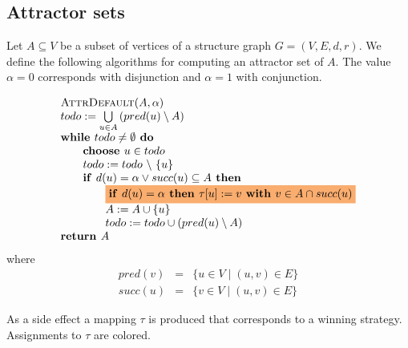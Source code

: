 \documentclass{article}
\newcommand{\If}{\text{\textbf{if }}}
\newcommand{\Do}{\text{\textbf{ do }}}
\newcommand{\Then}{\text{\textbf{ then }}}
\newcommand{\While}{\text{\textbf{while }}}
\newcommand{\Choose}{\text{\textbf{choose }}}
\newcommand{\Return}{\text{\textbf{return }}}
\newcommand{\With}{\text{\textbf{ with }}}
\begin{document}
\subsection{Attractor sets}
Let $A \subseteq V$ be a subset of vertices of a structure graph $G=(V,E,d,r)$. We
define the following algorithms for computing an attractor set of $A$. The value
$\alpha = 0$ corresponds with disjunction and $\alpha = 1$ with conjunction.

\begin{equation*}
\begin{array}{l}
\textsc{AttrDefault}(A,\alpha) \\ 
todo:=\bigcup\limits_{u\in A}\left( pred(u)\setminus A\right)  \\ 
\While todo\neq \emptyset \Do \\ 
\qquad \Choose u\in todo \\ 
\qquad todo:=todo\ \backslash \ \{u\} \\ 
\qquad \If d(u) = \alpha \vee succ(u)\subseteq A \Then \\ 
\qquad \qquad \colorbox{Apricot}{$ \If d(u) = \alpha \Then \tau
\lbrack u]:=v\With v\in A\cap succ(u) $}\\ 
\qquad \qquad A:=A\cup \{u\} \\ 
\qquad \qquad todo:=todo\cup \left( pred(u)\setminus A\right)  \\ 
\Return A%
\end{array}%
\end{equation*}%
where%
\begin{eqnarray*}
pred(v) &=&\{u\in V\mid (u,v)\in E\} \\
succ(u) &=&\{v\in V\mid (u,v)\in E\}
\end{eqnarray*}%

As a side effect a mapping $\tau$ is produced that corresponds to a winning
strategy. Assignments to $\tau$ are \colorbox{Apricot}{colored}.

%
\end{document}
